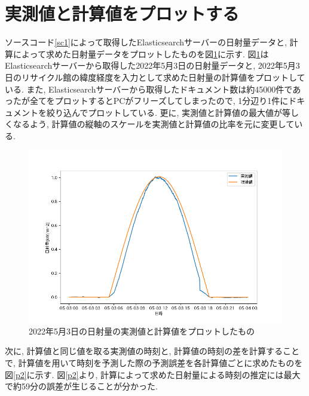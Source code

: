\documentclass[a4j,12pt,]{jarticle}
\begin{document}
\section{実測値と計算値をプロットする}
ソースコード\ref{sc1}によって取得したElasticsearchサーバーの日射量データと, 計算によって求めた日射量データをプロットしたものを図\ref{p1}に示す.
図\ref{p1}はElasticsearchサーバーから取得した2022年5月3日の日射量データと, 2022年5月3日のリサイクル館の緯度経度を入力として求めた日射量の計算値をプロットしている.
また, Elasticsearchサーバーから取得したドキュメント数は約45000件であったが全てをプロットするとPCがフリーズしてしまったので, 1分辺り1件にドキュメントを絞り込んでプロットしている.
更に, 実測値と計算値の最大値が等しくなるよう, 計算値の縦軸のスケールを実測値と計算値の比率を元に変更している.

\begin{figure}[H]
  \begin{center}
    \includegraphics[width=160mm]{compare.png}
    \caption{2022年5月3日の日射量の実測値と計算値をプロットしたもの}
    \label{p1}
  \end{center}
\end{figure}

次に, 計算値と同じ値を取る実測値の時刻と, 計算値の時刻の差を計算することで, 計算値を用いて時刻を予測した際の予測誤差を各計算値ごとに求めたものを図\ref{p2}に示す.
図\ref{p2}より, 計算によって求めた日射量による時刻の推定には最大で約59分の誤差が生じることが分かった.
\end{document}
